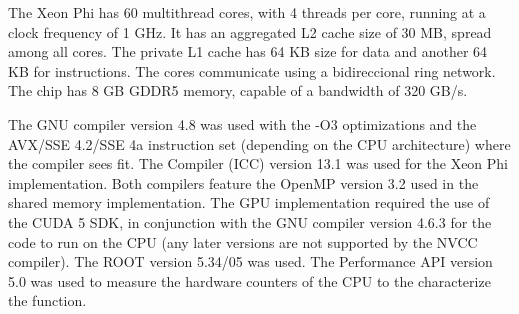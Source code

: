 The \intel Xeon Phi has 60 multithread cores, with 4 threads per core, running at a clock frequency of 1 GHz. It has an aggregated L2 cache size of 30 MB, spread among all cores. The private L1 cache has 64 KB size for data and another 64 KB for instructions. The cores communicate using a bidireccional ring network. The chip has 8 GB GDDR5 memory, capable of a bandwidth of 320 GB/s.

The GNU compiler version 4.8 was used with the -O3 optimizations and the AVX/SSE 4.2/SSE 4a instruction set (depending on the CPU architecture) where the compiler sees fit. The \intel Compiler (ICC) version 13.1 was used for the \intel Xeon Phi implementation. Both compilers feature the OpenMP version 3.2 used in the shared memory implementation. The GPU implementation required the use of the CUDA 5 SDK, in conjunction with the GNU compiler version 4.6.3 for the code to run on the CPU (any later versions are not supported by the \nvidia NVCC compiler). The ROOT \cite{CERN:ROOT} version 5.34/05 was used. The Performance API version 5.0 was used to measure the hardware counters of the CPU to the characterize the \ttDilepKinFit function.
